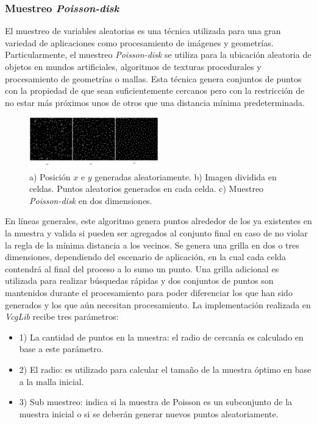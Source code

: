 \subsubsection{Muestreo \emph{Poisson-disk}}

El muestreo de variables aleatorias es una técnica utilizada para una gran variedad de aplicaciones como procesamiento de imágenes y geometrías. Particularmente, el muestreo \emph{Poisson-disk} se utiliza para la ubicación aleatoria de objetos en mundos artificiales, algoritmos de texturas procedurales y procesamiento de geometrías o mallas. Esta técnica genera conjuntos de puntos con la propiedad de que sean suficientemente cercanos pero con la restricción de no estar más próximos unos de otros que una distancia mínima predeterminada.

\begin{figure}[H]
  \centering
    \includegraphics[width=0.5\textwidth]{./Cap2_videomapping/malla-poisson.png}
  \caption[http://www.cgal.org]{a) Posición $x$ e $y$ generadas aleatoriamente. b) Imagen dividida en celdas. Puntos aleatorios generados en cada celda. c) Muestreo \emph{Poisson-disk} en dos dimensiones.}
  \label{fig:Mesh-Poisson}
\end{figure}

En líneas generales, este algoritmo genera puntos alrededor de los ya existentes en la muestra y valida si pueden ser agregados al conjunto final en caso de no violar la regla de la mínima distancia a los vecinos. Se genera una grilla en dos o tres dimensiones, dependiendo del escenario de aplicación, en la cual cada celda contendrá al final del proceso a lo sumo un punto. Una grilla adicional es utilizada para realizar búsquedas rápidas y dos conjuntos de puntos son mantenidos durante el procesamiento para poder diferenciar los que han sido generados y los que aún necesitan procesamiento.
La implementación realizada en \emph{VcgLib} recibe tres parámetros:
\begin{itemize}
  \item 1) La cantidad de puntos en la muestra: el radio de cercanía es calculado en base a este parámetro.
  \item 2) El radio: es utilizado para calcular el tamaño de la muestra óptimo en base a la malla inicial.
  \item 3) Sub muestreo: indica si la muestra de Poisson es un subconjunto de la muestra inicial o si se deberán generar nuevos puntos aleatoriamente.
\end{itemize}

